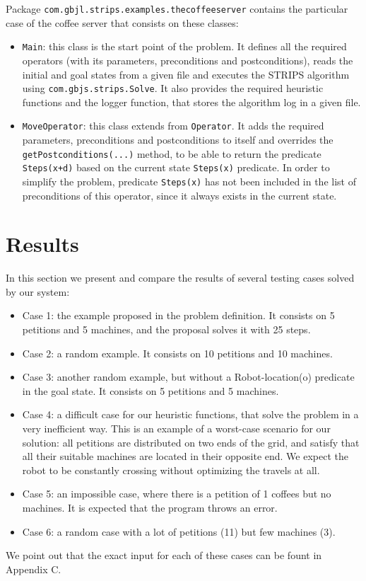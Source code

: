 \documentclass[12pt,a4paper,oneside]{article}
\numberwithin{equation}{section}
\numberwithin{equation}{section}
\theoremstyle{definition}
\begin{document}
Package \texttt{com.gbjl.strips.examples.thecoffeeserver} contains the particular case of the coffee server that consists on these classes:
\begin{itemize}
	\item \texttt{Main}: this class is the start point of the problem. It defines all the required operators (with its parameters, preconditions and postconditions), reads the initial and goal states from a given file and executes the STRIPS algorithm using \texttt{com.gbjs.strips.Solve}. It also provides the required heuristic functions and the logger function, that stores the algorithm log in a given file.
	\item \texttt{MoveOperator}: this class extends from \texttt{Operator}. It adds the required parameters, preconditions and postconditions to itself and overrides the \texttt{getPostconditions(...)} method, to be able to return the predicate \texttt{Steps(x+d)} based on the current state \texttt{Steps(x)} predicate. In order to simplify the problem, predicate \texttt{Steps(x)} has not been included in the list of preconditions of this operator, since it always exists in the current state.
\end{itemize}



\section{Results} \label{Results}

In this section we present and compare the results of several testing cases solved by our system:
\begin{itemize}
	\item Case 1: the example proposed in the problem definition. It consists on 5 petitions and 5 machines, and the proposal solves it with 25 steps.
	\item Case 2: a random example. It consists on 10 petitions and 10 machines.
	\item Case 3: another random example, but without a Robot-location(o) predicate in the goal state. It consists on 5 petitions and 5 machines.
	\item Case 4: a difficult case for our heuristic functions, that solve the problem in a very inefficient way. This is an example of a worst-case scenario for our solution: all petitions are distributed on two ends of the grid, and satisfy that all their suitable machines are located in their opposite end. We expect the robot to be constantly crossing without optimizing the travels at all.
	\item Case 5: an impossible case, where there is a petition of 1 coffees but no machines. It is expected that the program throws an error.
	\item Case 6: a random case with a lot of petitions (11) but few machines (3).
\end{itemize}
We point out that the exact input for each of these cases can be fount in Appendix C.
\end{document}
